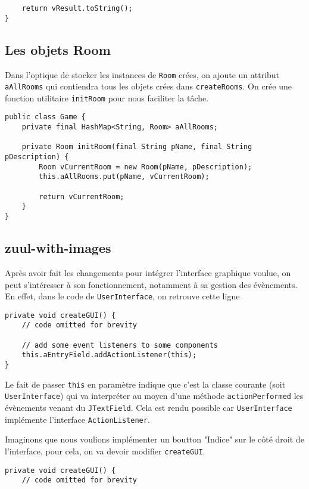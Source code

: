 \begin{exercise}[subtitle=getCommandList]
\begin{verbatim}
    return vResult.toString();
}
\end{verbatim}

\subsection*{Les objets Room}

Dans l'optique de stocker les instances de \verb|Room| crées, on ajoute un attribut \verb|aAllRooms| qui contiendra tous les objets crées dans \verb|createRooms|. On crée une fonction utilitaire \verb|initRoom| pour nous faciliter la tâche.

\begin{verbatim}
public class Game {
    private final HashMap<String, Room> aAllRooms;

    private Room initRoom(final String pName, final String pDescription) {
        Room vCurrentRoom = new Room(pName, pDescription);
        this.aAllRooms.put(pName, vCurrentRoom);

        return vCurrentRoom;
    }
}
\end{verbatim}

\subsection*{zuul-with-images}

Après avoir fait les changements pour intégrer l'interface graphique voulue, on peut s'intéresser à son fonctionnement, notamment à sa gestion des évènements. En effet, dans le code de \verb|UserInterface|, on retrouve cette ligne

\begin{verbatim}
private void createGUI() {
    // code omitted for brevity
    
    // add some event listeners to some components
    this.aEntryField.addActionListener(this);
}
\end{verbatim}

Le fait de passer \verb|this| en paramètre indique que c'est la classe courante (soit \verb|UserInterface|) qui va interpréter au moyen d'une méthode \verb|actionPerformed| les évènements venant du \verb|JTextField|. Cela est rendu possible car \verb|UserInterface| implémente l'interface \verb|ActionListener|.

Imaginons que nous voulions implémenter un boutton "Indice" sur le côté droit de l'interface, pour cela, on va devoir modifier \verb|createGUI|.

\begin{verbatim}
private void createGUI() {
    // code omitted for brevity
    

\end{verbatim}
\end{exercise}
